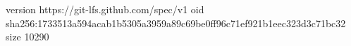 version https://git-lfs.github.com/spec/v1
oid sha256:1733513a594acab1b5305a3959a89c69be0ff96c71ef921b1eec323d3c71bc32
size 10290
